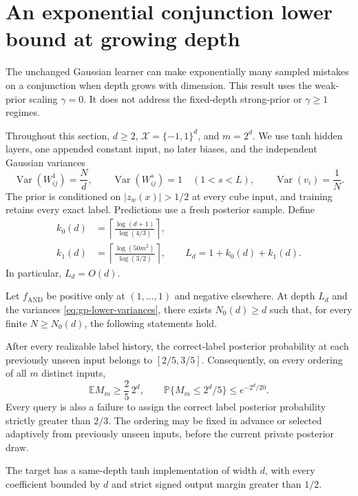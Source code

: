 \section{An exponential conjunction lower bound at growing depth}
\label{sec:gp-deep-and}

The unchanged Gaussian learner can make exponentially many sampled
mistakes on a conjunction when depth grows with dimension. This result
uses the weak-prior scaling $\gamma=0$. It does not address the
fixed-depth strong-prior or $\gamma\ge1$ regimes.

Throughout this section, $d\ge2$, $\mathcal X=\{-1,1\}^d$, and $m=2^d$.
We use tanh hidden layers, one appended constant input, no later biases,
and the independent Gaussian variances
\begin{equation}\label{eq:gp-lower-variances}
 \operatorname{Var}(W^1_{ij})=\frac Nd,\qquad
 \operatorname{Var}(W^s_{ij})=1\quad(1<s<L),\qquad
 \operatorname{Var}(v_i)=\frac1N.
\end{equation}
The prior is conditioned on $|z_w(x)|>1/2$ at every cube input, and
training retains every exact label. Predictions use a fresh posterior
sample. Define
\begin{equation}\label{eq:gp-lower-depth}
 \begin{split}
 k_0(d)&=\left\lceil\frac{\log(d+1)}{\log(4/3)}\right\rceil,\\
 k_1(d)&=\left\lceil\frac{\log(50m^2)}{\log(3/2)}\right\rceil,\qquad
 L_d=1+k_0(d)+k_1(d).
 \end{split}
\end{equation}
In particular, $L_d=O(d)$.

\begin{theorem}
\label{thm:gp-deep-and}
Let $f_{\mathrm{AND}}$ be positive only at $(1,\ldots,1)$ and negative
elsewhere. At depth $L_d$ and the variances
\eqref{eq:gp-lower-variances}, there exists $N_0(d)\ge d$ such that,
for every finite $N\ge N_0(d)$, the following statements hold.

After every realizable label history, the correct-label posterior
probability at each previously unseen input belongs to $[2/5,3/5]$.
Consequently, on every ordering of all $m$ distinct inputs,
\begin{equation}\label{eq:gp-lower-mistakes}
 \mathbb E M_m\ge\frac25\,2^d,\qquad
 \mathbb P\{M_m\le2^d/5\}\le e^{-2^d/20}.
\end{equation}
Every query is also a failure to assign the correct label posterior
probability strictly greater than $2/3$. The ordering may be fixed in
advance or selected adaptively from previously unseen inputs, before
the current private posterior draw.

The target has a same-depth tanh implementation of width $d$, with
every coefficient bounded by $d$ and strict signed output margin
greater than $1/2$.
\end{theorem}


